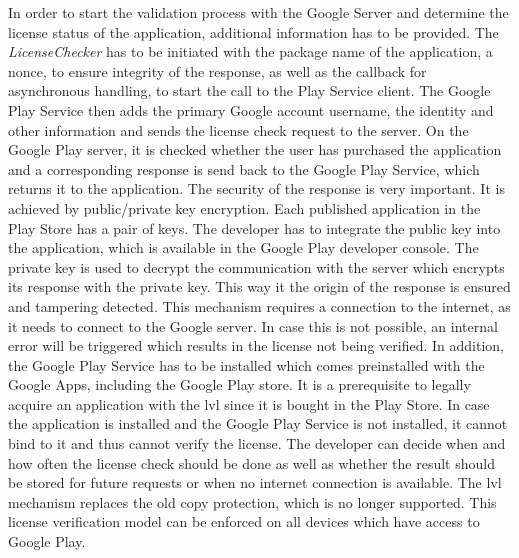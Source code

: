 In order to start the validation process with the Google Server and determine the license status of the application, additional information has to be provided.
The \textit{LicenseChecker} has to be initiated with the package name of the application, a nonce, to ensure integrity of the response, as well as the callback for asynchronous handling, to start the call to the Play Service client.
The Google Play Service then adds the primary Google account username, the identity and other information and sends the license check request to the server.
On the Google Play server, it is checked whether the user has purchased the application and a corresponding response is send back to the Google Play Service, which returns it to the application. \cite{developersLicensingOverview}
\newline
The security of the response is very important.
It is achieved by public/private key encryption.
Each published application in the Play Store has a pair of keys.
The developer has to integrate the public key into the application, which is available in the Google Play developer console.
The private key is used to decrypt the communication with the server which encrypts its response with the private key.
This way it the origin of the response is ensured and tampering detected.
\cite{munteanLicense} \cite{developersLicensingOverview}
\newline
This mechanism requires a connection to the internet, as it needs to connect to the Google server.
In case this is not possible, an internal error will be triggered which results in the license not being verified.
In addition, the Google Play Service has to be installed which comes preinstalled with the Google Apps, including the Google Play store.
It is a prerequisite to legally acquire an application with the \gls{lvl} since it is bought in the Play Store.
In case the application is installed and the Google Play Service is not installed, it cannot bind to it and thus cannot verify the license.
The developer can decide when and how often the license check should be done as well as whether the result should be stored for future requests or when no internet connection is available. \cite{developersLicensingAdding } \cite{developersLicensingOverview}
\newline
The \gls{lvl} mechanism replaces the old copy protection, which is no longer supported.
This license verification model can be enforced on all devices which have access to Google Play. \cite{developersLicensingAdding} \cite{developersLicensingOverview}
